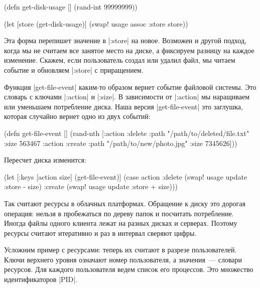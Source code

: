 \begin{english}
  \begin{clojure}
(defn get-disk-usage []
  (rand-int 99999999))

(let [store (get-disk-usage)]
  (swap! usage assoc :store store))
  \end{clojure}
\end{english}

Эта форма перепишет значение в \spverb|:store| на новое. Возможен и другой
подход, когда мы не считаем все занятое место на диске, а фиксируем разницу на
каждое изменение. Скажем, если пользователь создал или удалил файл, мы читаем
событие и обновляем \spverb|:store| с приращением.

Функция \spverb|get-file-event| каким-то образом вернет событие файловой
системы. Это словарь с ключами \spverb|:action| и \spverb|:size|. В зависимости
от \spverb|:action| мы наращиваем или уменьшаем потребление диска. Наша версия
\spverb|get-file-event| это заглушка, которая случайно вернет одно из двух
событий:

\begin{english}
  \begin{clojure}
(defn get-file-event []
  (rand-nth
   [{:action :delete
     :path "/path/to/deleted/file.txt"
     :size 563467}
    {:action :create
     :path "/path/to/new/photo.jpg"
     :size 7345626}]))
  \end{clojure}
\end{english}

\noindent
Пересчет диска изменится:

\begin{english}
  \begin{clojure}
(let [{:keys [action size]} (get-file-event)]
  (case action
    :delete
    (swap! usage update :store - size)
    :create
    (swap! usage update :store + size)))
  \end{clojure}
\end{english}

Так считают ресурсы в облачных платформах. Обращение к диску это дорогая
операция: нельзя в пробежаться по дереву папок и посчитать потребление. Иногда
файлы одного клиента лежат на разных дисках и серверах. Поэтому ресурсы считают
итеративно и раз в интервал сверяют цифры.

Усложним пример с ресурсами: теперь их считают в разрезе пользователей. Ключи
верхнего уровня означают номер пользователя, а значения~--- словари
ресурсов. Для каждого пользователя ведем список его процессов. Это множество
идентификаторов \spverb|PID|.

